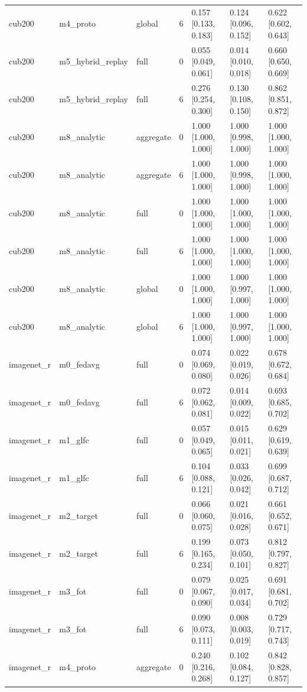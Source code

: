 \begin{tabular}{lllrlll}
cub200 & m4\_proto & global & 6 & 0.157 [0.133, 0.183] & 0.124 [0.096, 0.152] & 0.622 [0.602, 0.643] \\
cub200 & m5\_hybrid\_replay & full & 0 & 0.055 [0.049, 0.061] & 0.014 [0.010, 0.018] & 0.660 [0.650, 0.669] \\
cub200 & m5\_hybrid\_replay & full & 6 & 0.276 [0.254, 0.300] & 0.130 [0.108, 0.150] & 0.862 [0.851, 0.872] \\
cub200 & m8\_analytic & aggregate & 0 & 1.000 [1.000, 1.000] & 1.000 [0.998, 1.000] & 1.000 [1.000, 1.000] \\
cub200 & m8\_analytic & aggregate & 6 & 1.000 [1.000, 1.000] & 1.000 [0.998, 1.000] & 1.000 [1.000, 1.000] \\
cub200 & m8\_analytic & full & 0 & 1.000 [1.000, 1.000] & 1.000 [1.000, 1.000] & 1.000 [1.000, 1.000] \\
cub200 & m8\_analytic & full & 6 & 1.000 [1.000, 1.000] & 1.000 [1.000, 1.000] & 1.000 [1.000, 1.000] \\
cub200 & m8\_analytic & global & 0 & 1.000 [1.000, 1.000] & 1.000 [0.997, 1.000] & 1.000 [1.000, 1.000] \\
cub200 & m8\_analytic & global & 6 & 1.000 [1.000, 1.000] & 1.000 [0.997, 1.000] & 1.000 [1.000, 1.000] \\
imagenet\_r & m0\_fedavg & full & 0 & 0.074 [0.069, 0.080] & 0.022 [0.019, 0.026] & 0.678 [0.672, 0.684] \\
imagenet\_r & m0\_fedavg & full & 6 & 0.072 [0.062, 0.081] & 0.014 [0.009, 0.022] & 0.693 [0.685, 0.702] \\
imagenet\_r & m1\_glfc & full & 0 & 0.057 [0.049, 0.065] & 0.015 [0.011, 0.021] & 0.629 [0.619, 0.639] \\
imagenet\_r & m1\_glfc & full & 6 & 0.104 [0.088, 0.121] & 0.033 [0.026, 0.042] & 0.699 [0.687, 0.712] \\
imagenet\_r & m2\_target & full & 0 & 0.066 [0.060, 0.075] & 0.021 [0.016, 0.028] & 0.661 [0.652, 0.671] \\
imagenet\_r & m2\_target & full & 6 & 0.199 [0.165, 0.234] & 0.073 [0.050, 0.101] & 0.812 [0.797, 0.827] \\
imagenet\_r & m3\_fot & full & 0 & 0.079 [0.067, 0.090] & 0.025 [0.017, 0.034] & 0.691 [0.681, 0.702] \\
imagenet\_r & m3\_fot & full & 6 & 0.090 [0.073, 0.111] & 0.008 [0.003, 0.019] & 0.729 [0.717, 0.743] \\
imagenet\_r & m4\_proto & aggregate & 0 & 0.240 [0.216, 0.268] & 0.102 [0.084, 0.127] & 0.842 [0.828, 0.857] \\

\end{tabular}
